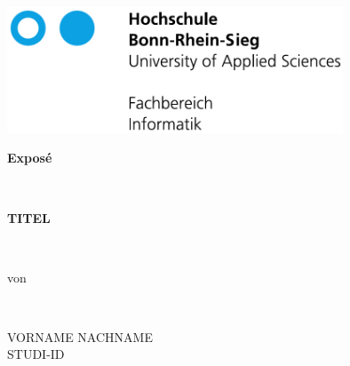 \documentclass[12pt]{article}
\begin{document}

\begin{titlepage}


  \begin{minipage}[t]{10cm}
  \includegraphics[width=10cm]{h-logo-full-font-embed}\\
  \end{minipage}
  \vspace{2.5cm}

	\begin{center}

    \vspace{0.8cm}

    \vspace{3cm}
    \begin{Huge}
    \textbf{Exposé}\end{Huge}\\
    \vspace{0.8cm}
  	\begin{huge}
  	\textbf{TITEL}
  	\end{huge}
  	 \vspace{0.6cm} \\
  	  	  \begin{large}von
  	  \end{large}
  	  \\ \begin{LARGE}
  	   \vspace{0.6cm}
  	  {VORNAME NACHNAME}\\
  	  STUDI-ID\\
  	  \vspace{0.8cm}
  	 
  	\end{LARGE}
  	
    \vspace{3.0cm}
			\end{center}
	\begin{large}


\end{large}
\end{titlepage}
\end{document}

